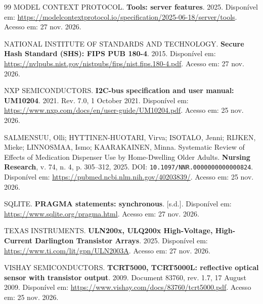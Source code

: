 \begin{thebibliography}{99}
MODEL CONTEXT PROTOCOL. \textbf{Tools: server features}. 2025. Disponível em: \url{https://modelcontextprotocol.io/specification/2025-06-18/server/tools}. Acesso em: 27 nov. 2026.

NATIONAL INSTITUTE OF STANDARDS AND TECHNOLOGY. \textbf{Secure Hash Standard ({SHS}): {FIPS PUB} 180-4}. 2015. Disponível em: \url{https://nvlpubs.nist.gov/nistpubs/fips/nist.fips.180-4.pdf}. Acesso em: 27 nov. 2026.

NXP SEMICONDUCTORS. \textbf{I2C-bus specification and user manual: UM10204}. 2021. Rev. 7.0, 1 October 2021. Disponível em: \url{https://www.nxp.com/docs/en/user-guide/UM10204.pdf}. Acesso em: 25 nov. 2026.

SALMENSUU, Olli; HYTTINEN-HUOTARI, Virva; ISOTALO, Jenni; RIJKEN, Mieke; LINNOSMAA, Ismo; KAARAKAINEN, Minna. Systematic Review of Effects of Medication Dispenser Use by Home-Dwelling Older Adults. \textbf{Nursing Research}, v. 74, n. 4, p. 305--312, 2025. DOI: \nolinkurl{10.1097/NNR.0000000000000824}. Disponível em: \url{https://pubmed.ncbi.nlm.nih.gov/40203839/}. Acesso em: 25 nov. 2026.

SQLITE. \textbf{PRAGMA statements: synchronous}. [s.d.]. Disponível em: \url{https://www.sqlite.org/pragma.html}. Acesso em: 27 nov. 2026.

TEXAS INSTRUMENTS. \textbf{ULN200x, ULQ200x High-Voltage, High-Current Darlington Transistor Arrays}. 2025. Disponível em: \url{https://www.ti.com/lit/gpn/ULN2003A}. Acesso em: 27 nov. 2026.

VISHAY SEMICONDUCTORS. \textbf{TCRT5000, TCRT5000L: reflective optical sensor with transistor output}. 2009. Document 83760, rev. 1.7, 17 August 2009. Disponível em: \url{https://www.vishay.com/docs/83760/tcrt5000.pdf}. Acesso em: 25 nov. 2026.


\end{thebibliography}
